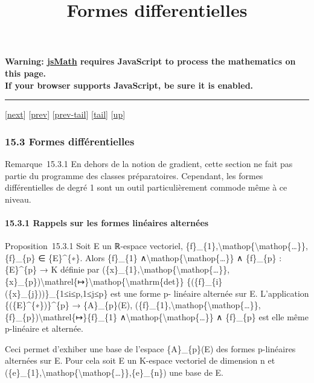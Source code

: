 \documentclass[]{article}
\title{Formes differentielles}
\author{}
\date{}
\begin{document}
\maketitle

\textbf{Warning: \href{http://www.math.union.edu/locate/jsMath}{jsMath}
requires JavaScript to process the mathematics on this page.\\ If your
browser supports JavaScript, be sure it is enabled.}

\begin{center}\rule{3in}{0.4pt}\end{center}

{[}\href{coursse85.html}{next}{]} {[}\href{coursse83.html}{prev}{]}
{[}\href{coursse83.html\#tailcoursse83.html}{prev-tail}{]}
{[}\hyperref[tailcoursse84.html]{tail}{]}
{[}\href{coursch16.html\#coursse84.html}{up}{]}

\subsubsection{15.3 Formes différentielles}

Remarque~15.3.1 En dehors de la notion de gradient, cette section ne
fait pas partie du programme des classes préparatoires. Cependant, les
formes différentielles de degré 1 sont un outil particulièrement commode
même à ce niveau.

\paragraph{15.3.1 Rappels sur les formes linéaires alternées}

Proposition~15.3.1 Soit E un ℝ-espace vectoriel,
\{f\}\_\{1\},\textbackslash{}mathop\{\textbackslash{}mathop\{\ldots{}\}\},\{f\}\_\{p\}
∈ \{E\}\^{}\{∗\}. Alors \{f\}\_\{1\}
∧\textbackslash{}mathop\{\textbackslash{}mathop\{\ldots{}\}\} ∧
\{f\}\_\{p\} : \{E\}\^{}\{p\} → K définie par
(\{x\}\_\{1\},\textbackslash{}mathop\{\textbackslash{}mathop\{\ldots{}\}\},\{x\}\_\{p\})\textbackslash{}mathrel\{↦\}\textbackslash{}mathop\{\textbackslash{}mathrm\{det\}\}
\{(\{f\}\_\{i\}(\{x\}\_\{j\}))\}\_\{1≤i≤p,1≤j≤p\} est une forme p-
linéaire alternée sur E. L'application \{(\{E\}\^{}\{∗\})\}\^{}\{p\} →
\{A\}\_\{p\}(E),
(\{f\}\_\{1\},\textbackslash{}mathop\{\textbackslash{}mathop\{\ldots{}\}\},\{f\}\_\{p\})\textbackslash{}mathrel\{↦\}\{f\}\_\{1\}
∧\textbackslash{}mathop\{\textbackslash{}mathop\{\ldots{}\}\} ∧
\{f\}\_\{p\} est elle même p-linéaire et alternée.

Ceci permet d'exhiber une base de l'espace \{A\}\_\{p\}(E) des formes
p-linéaires alternées sur E. Pour cela soit E un K-espace vectoriel de
dimension n et
(\{e\}\_\{1\},\textbackslash{}mathop\{\textbackslash{}mathop\{\ldots{}\}\},\{e\}\_\{n\})
une base de E.
\end{document}
